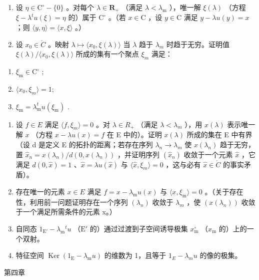 \begin{enumerate}
\def\labelenumi{\alph{enumi})}
\item
  设 \(\eta \in \mathrm{C}^{\circ} - \{0\}\) 。对每个 \(\lambda \in \mathbf{R}_{+}\) （满足 \(\lambda < \lambda_{\mathrm{m}}\) ），唯一解 \(\xi(\lambda)\) （方程 \(\xi - \lambda^{t}u(\xi) = \eta\) 的）属于 \(\mathrm{C}^{\circ}\) 。（若 \(x \in \mathrm{C}\) ，设 \(y \in \mathrm{C}\) 满足 \(y - \lambda u(y) = x\) ；则 \(\langle y, \eta \rangle = \langle x, \xi \rangle\) 。）
\item
  设 \(x_{0} \in \mathring{C}\) 。映射 \(\lambda \mapsto \langle x_{0}, \xi(\lambda) \rangle\) 当 \(\lambda\) 趋于 \(\lambda_{m}\) 时趋于无穷。证明值 \(\xi(\lambda)/\langle x_{0}, \xi(\lambda) \rangle\) 所成的集有一个聚点 \(\xi_{m}\) 满足：
\end{enumerate}

\begin{enumerate}
\def\labelenumi{(\roman{enumi})}
\item
  \(\xi_{\mathrm{m}}\in \mathrm{C}^{\circ}\) ;
\item
  \(\langle x_{0},\xi_{m}\rangle=1;\)
\item
  \(\xi_{\mathrm{m}} = \lambda_{\mathrm{m}}^{t}u(\xi_{\mathrm{m}})\) .
\end{enumerate}

\begin{enumerate}
\def\labelenumi{\alph{enumi})}
\setcounter{enumi}{2}
\item
  设 \(f \in E\) 满足 \(\langle f, \xi_{m} \rangle = 0\) 。对 \(\lambda \in R_{+}\) （满足 \(\lambda < \lambda_{m}\) ），用 \(x(\lambda)\) 表示唯一解 \(x\) （方程 \(x - \lambda u(x) = f\) 在 E 中的）。证明 \(x(\lambda)\) 所成的集在 E 中有界（设 d 是定义 E 的拓扑的距离；若存在序列 \(\lambda_{n} \to \lambda_{m}\) 使 \(x(\lambda_{n})\) 趋于无穷，置 \(\hat{x}_{n} = x(\lambda_{n}) / d(0, x(\lambda_{n}))\) ，并证明序列 \((\hat{x}_{n})\) 收敛于一个元素 \(\hat{x}\) ，它满足 \(d(0, \hat{x}) = 1\) 、\(\hat{x} = \lambda u(\hat{x})\) 与 \(\langle \hat{x}, \xi_{m} \rangle = 0\) ，这与必有 \(\hat{x} \in \mathring{C}\) 的事实矛盾）。
\item
  存在唯一的元素 \(x \in E\) 满足 \(f = x - \lambda_{\mathrm{m}} u(x)\) 与 \(\langle x, \xi_{\mathrm{m}} \rangle = 0\) 。（关于存在性，利用前一问题证明存在一个序列 \((\lambda_{n})\) 收敛于 \(\lambda_{m}\) ，使 \((x(\lambda_{n}))\) 收敛于一个满足所需条件的元素 x。）
\item
  自同态 \(1_{\mathrm{E}'} - \lambda_{\mathrm{m}}{}^{t}u\) （\(\mathrm{E}'\) 的）通过过渡到子空间诱导极集 \(x_{\mathrm{m}}^{\circ}\) （\(x_{\mathrm{m}}\) 的）上的一个双射。
\item
  特征空间 \(\operatorname{Ker}(1_{\mathrm{E}} - \lambda_{\mathrm{m}}u)\) 的维数为 1，且等于 \(1_{E} - \lambda_{m}u\) 的像的极集。
\end{enumerate}

第四章


